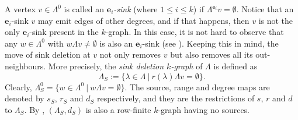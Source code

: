 \documentclass[12pt]{amsart}
\theoremstyle{definition}
\theoremstyle{remark}
\begin{document}
A vertex $v\in \Lambda^0$ is called an \emph{$\mathbf{e}_i$-sink} (where $1\le i\le k$) if $\Lambda^{\mathbf{e}_i}v=\emptyset$. Notice that an $\mathbf{e}_i$-sink $v$ may emit edges of other degrees, and if that happens, then $v$ is not the only $\mathbf{e}_i$-sink present in the $k$-graph. In this case, it is not hard to observe that any $w\in \Lambda^0$ with $w\Lambda v\neq \emptyset$ is also an $\mathbf{e}_i$-sink (see \cite[Lemma 5.3]{EFGGGP}). Keeping this in mind, the move of sink deletion at $v$ not only removes $v$ but also removes all its out-neighbours. More precisely, the \emph{sink deletion $k$-graph} of $\Lambda$ is defined as \[\Lambda_S:=\{\lambda\in \Lambda~|~r(\lambda)\Lambda v=\emptyset\}.\] Clearly, $\Lambda_S^0=\{w\in \Lambda^0~|~w\Lambda v=\emptyset\}$. The source, range and degree maps are denoted by $s_S$, $r_S$ and $d_S$ respectively, and they are the restrictions of $s$, $r$ and $d$ to $\Lambda_S$. By \cite[Theorem 5.4]{EFGGGP}, $(\Lambda_S,d_S)$ is also a row-finite $k$-graph having no sources. 
\end{document}
